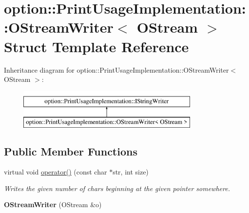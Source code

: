 \hypertarget{structoption_1_1_print_usage_implementation_1_1_o_stream_writer}{}\section{option\+:\+:Print\+Usage\+Implementation\+:\+:O\+Stream\+Writer$<$ O\+Stream $>$ Struct Template Reference}
\label{structoption_1_1_print_usage_implementation_1_1_o_stream_writer}
Inheritance diagram for option\+:\+:Print\+Usage\+Implementation\+:\+:O\+Stream\+Writer$<$ O\+Stream $>$\+:\begin{figure}[H]
\begin{center}
\leavevmode
\includegraphics[height=2.000000cm]{structoption_1_1_print_usage_implementation_1_1_o_stream_writer}
\end{center}
\end{figure}
\subsection*{Public Member Functions}
\begin{DoxyCompactItemize}
\item 
\mbox{\label{structoption_1_1_print_usage_implementation_1_1_o_stream_writer_a323890fba123ad476fa2471029fc7b23}} 
virtual void \hyperlink{structoption_1_1_print_usage_implementation_1_1_o_stream_writer_a323890fba123ad476fa2471029fc7b23}{operator()} (const char $\ast$str, int size)
\begin{DoxyCompactList}\small\item\em Writes the given number of chars beginning at the given pointer somewhere. \end{DoxyCompactList}\item 
\mbox{\label{structoption_1_1_print_usage_implementation_1_1_o_stream_writer_abf38eb181267e96d86de1ea09ad22c3f}} 
{\bfseries O\+Stream\+Writer} (O\+Stream \&o)
\end{DoxyCompactItemize}
